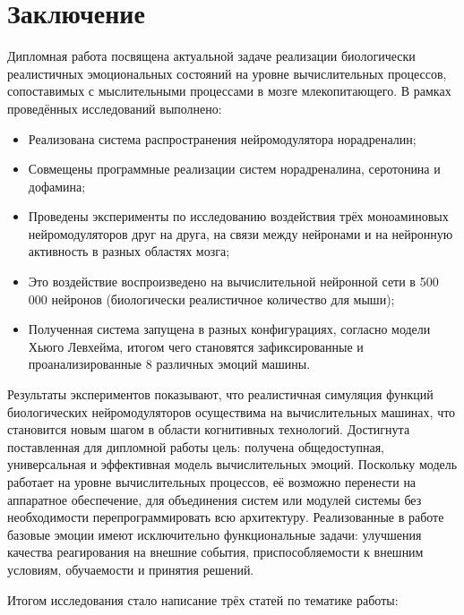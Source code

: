 \cleardoublepage
{}
{}
\chapter*{Заключение}
\label{chap:conclusion}
Дипломная работа посвящена актуальной задаче реализации биологически реалистичных эмоциональных состояний на уровне вычислительных процессов, сопоставимых с мыслительными процессами в мозге млекопитающего. В рамках проведённых исследований выполнено:
\begin{itemize}
\item Реализована система распространения нейромодулятора норадреналин;
\item Совмещены программные реализации систем норадреналина, серотонина и дофамина;
\item Проведены эксперименты по исследованию воздействия трёх моноаминовых нейромодуляторов друг на друга, на связи между нейронами и на нейронную активность в разных областях мозга;
\item Это воздействие воспроизведено на вычислительной нейронной сети в 500 000 нейронов (биологически реалистичное количество для мыши);
\item Полученная система запущена в разных конфигурациях, согласно модели Хьюго Левхейма, итогом чего становятся зафиксированные и проанализированные 8 различных эмоций машины.
\end{itemize}
	
	
Результаты экспериментов показывают, что реалистичная симуляция функций биологических нейромодуляторов осуществима на вычислительных машинах, что становится новым шагом в области когнитивных технологий. Достигнута поставленная для дипломной работы цель: получена общедоступная, универсальная и эффективная модель вычислительных эмоций. Поскольку модель работает на уровне вычислительных процессов, её возможно перенести на аппаратное обеспечение, для объединения систем или модулей системы без необходимости перепрограммировать всю архитектуру. Реализованные в работе базовые эмоции имеют исключительно функциональные задачи: улучшения качества реагирования на внешние события, приспособляемости к внешним условиям, обучаемости и принятия решений.


Итогом исследования стало написание трёх статей по тематике работы:

